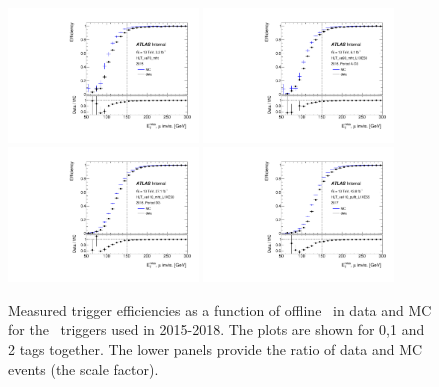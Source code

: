 \begin{figure}[tb!]
	\centering
	\includegraphics[width=0.45\textwidth]{chapters/c6/figures/METTriggerCalibration/efficiecy_HLT_xe70_mht.pdf}
	\includegraphics[width=0.45\textwidth]{chapters/c6/figures/METTriggerCalibration/efficiecy_HLT_xe90_mht_L1XE50.pdf}
	\includegraphics[width=0.45\textwidth]{chapters/c6/figures/METTriggerCalibration/efficiecy_HLT_xe110_mht_L1XE50.pdf}
	\includegraphics[width=0.45\textwidth]{chapters/c6/figures/METTriggerCalibration/efficiecy_HLT_xe110_pufit_L1XE55.pdf}
	\caption{Measured trigger efficiencies as a function of offline \METnomu~in data and MC for the \MET~triggers used in 2015-2018. The plots are shown for 0,1 and 2 tags together. The lower panels provide the ratio of data and MC events (the scale factor).}
	\label{fig:TrigEff}
\end{figure}

